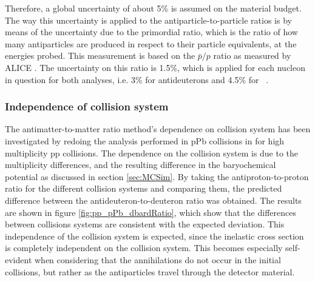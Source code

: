 Therefore, a global uncertainty of about 5\% is assumed on the material budget. The way this uncertainty is applied to the antiparticle-to-particle ratios is by means of the uncertainty due to the primordial ratio, which is the ratio of how many antiparticles are produced in respect to their particle equivalents, at the energies probed. This measurement is based on the $\bar{p}/p$ ratio as measured by ALICE \cite{}. The uncertainty on this ratio is 1.5\%, which is applied for each nucleon in question for both analyses, i.e. 3\% for antideuterons and 4.5\% for \ahe\ \atrit .
\subsubsection{Independence of collision system}
The antimatter-to-matter ratio method's dependence on collision system has been investigated by redoing the analysis performed in pPb collisions in \cite{dbarIvan} for high multiplicity pp collisions. The dependence on the collision system is due to the multiplicity differences, and the resulting difference in the baryochemical potential as discussed in section \ref{sec:MCSim}. By taking the antiproton-to-proton ratio for the different collision systems and comparing them, the predicted difference between the antideuteron-to-deuteron ratio was obtained. The results are shown in figure \ref{fig:pp_pPb_dbardRatio}, which show that the differences between collisions systems are consistent with the expected deviation. This independence of the collision system is expected, since the inelastic cross section is completely independent on the collision system. This becomes especially self-evident when considering that the annihilations do not occur in the initial collisions, but rather as the antiparticles travel through the detector material.

